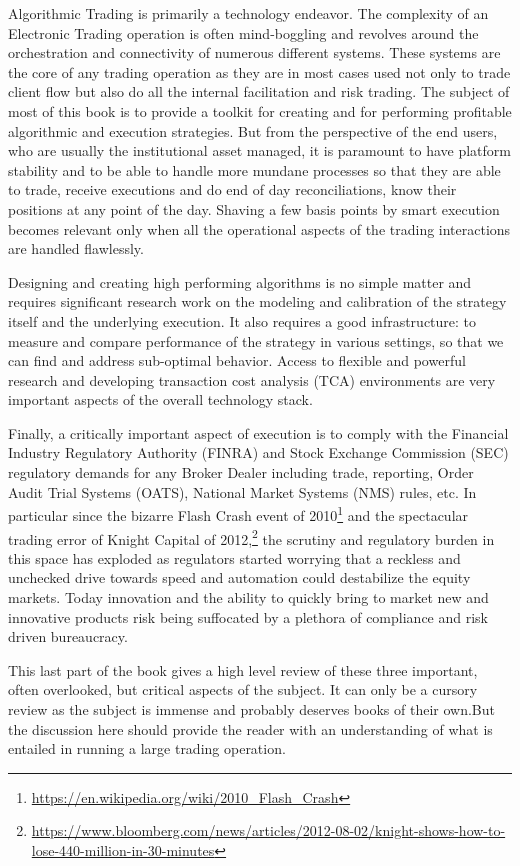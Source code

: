 
Algorithmic Trading is primarily a technology endeavor. The complexity of an Electronic Trading operation is often mind-boggling and revolves around the orchestration and connectivity of numerous different systems. These systems are the core of any trading operation as they are in most cases used not only to trade client flow but also do all the internal facilitation and risk trading. The subject of most of this book is to provide a toolkit for creating and for performing profitable algorithmic and execution strategies. But from the perspective of the end users, who are usually the institutional asset managed, it is paramount to have platform stability and to be able to handle more mundane processes so that they are able to trade, receive executions and do end of day reconciliations, know their positions at any point of the day. Shaving a few basis points by smart execution becomes relevant only when all the operational aspects of the trading interactions are handled flawlessly.


Designing and creating high performing algorithms is no simple matter and requires significant research work on the modeling and calibration of the strategy itself and the underlying execution. It also requires a good infrastructure: to measure and compare performance of the strategy in various settings, so that we can find and address sub-optimal behavior. Access to flexible and powerful research and developing transaction cost analysis (TCA) environments are very important aspects of the overall technology stack.


Finally, a critically important aspect of execution is to comply with the Financial Industry Regulatory Authority (FINRA) and Stock Exchange Commission (SEC) regulatory demands for any Broker Dealer including trade, reporting, Order Audit Trial Systems (OATS), National Market Systems (NMS) rules, etc. In particular since the bizarre Flash Crash event of 2010\footnote{\url{https://en.wikipedia.org/wiki/2010_Flash_Crash}} and the spectacular trading error of Knight Capital of 2012,\footnote{\url{https://www.bloomberg.com/news/articles/2012-08-02/knight-shows-how-to-lose-440-million-in-30-minutes}} the scrutiny and regulatory burden in this space has exploded as regulators started worrying that a reckless and unchecked drive towards speed and automation could destabilize the equity markets. Today innovation and the ability to quickly bring to market new and innovative products risk being suffocated by a plethora of compliance and risk driven bureaucracy. 


This last part of the book gives a high level review of these three important, often overlooked, but critical aspects of the subject. It can only be a cursory review as the subject is immense and probably deserves books of their own.But the discussion here should provide the reader with an understanding of what is entailed in running a large trading operation.